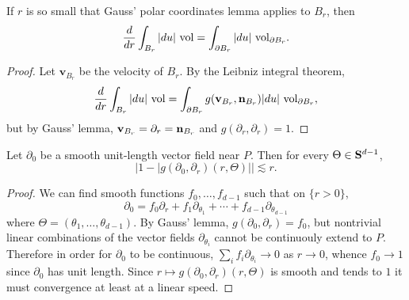 \begin{lemma}\label{GaussLeibniz}
If $r$ is so small that Gauss' polar coordinates lemma applies to $B_r$, then
$$\frac{d}{dr} \int_{B_r} |du| ~\mathrm{vol} = \int_{\partial B_r} |du| ~\mathrm{vol}_{\partial B_r}.$$
\end{lemma}
\begin{proof}
Let $\mathbf v_{B_r}$ be the velocity of $B_r$.
By the Leibniz integral theorem,
$$\frac{d}{dr} \int_{B_r} |du| ~\mathrm{vol} = \int_{\partial B_r} g(\mathbf v_{B_r}, \mathbf n_{B_r}) |du| ~\mathrm{vol}_{\partial B_r},$$
but by Gauss' lemma, $\mathbf v_{B_r} = \partial_r = \mathbf n_{B_r}$ and $g(\partial_r, \partial_r) = 1$.
\end{proof}

\begin{lemma}\label{quasiradial}
Let $\partial_0$ be a smooth unit-length vector field near $P$. Then for every $\Theta \in \mathbf S^{d - 1}$,
\begin{equation}\label{quasiradial claim}
|1 - |g(\partial_0, \partial_r)(r, \Theta)|| \lesssim r.
\end{equation}
\end{lemma}
\begin{proof}
We can find smooth functions $f_0, \dots, f_{d - 1}$ such that on $\{r > 0\}$,
$$\partial_0 = f_0 \partial_r + f_1 \partial_{\theta_1} + \cdots + f_{d - 1} \partial_{\theta_{d - 1}}$$
where $\Theta = (\theta_1, \dots, \theta_{d - 1})$.
By Gauss' lemma, $g(\partial_0, \partial_r) = f_0$, but nontrivial linear combinations of the vector fields $\partial_{\theta_i}$ cannot be continuouly extend to $P$.
Therefore in order for $\partial_0$ to be continuous, $\sum_i f_i \partial_{\theta_i} \to 0$ as $r \to 0$, whence $f_0 \to 1$ since $\partial_0$ has unit length.
Since $r \mapsto g(\partial_0, \partial_r)(r, \Theta)$ is smooth and tends to $1$ it must convergence at least at a linear speed.
\end{proof}

